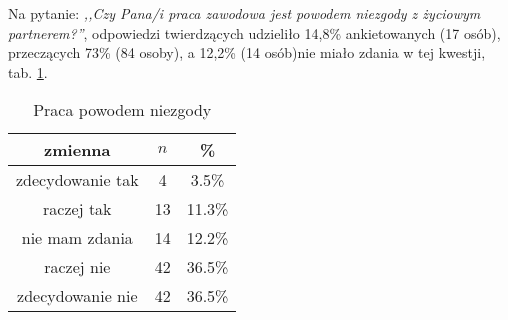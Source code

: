 
Na pytanie: \textit{,,Czy  Pana/i praca zawodowa jest powodem niezgody z życiowym partnerem?''}, odpowiedzi twierdzących udzieliło 14,8\% ankietowanych (17 osób), przeczących 73\% (84 osoby), a 12,2\% (14 osób)nie miało zdania w tej kwestji, tab. \ref{tab:Q28}.

\begin{table}[H]
\caption{Praca powodem niezgody}
\centering
\begin{tabular}{ | c | c | c |}
\hline
zmienna & $n$ & \% \\
\hline
zdecydowanie tak  &  4  & 3.5\% \\
\hline
raczej tak  &  13  & 11.3\% \\
\hline
nie mam zdania  &  14  & 12.2\% \\
\hline
raczej nie  &  42  & 36.5\% \\
\hline
zdecydowanie nie  &  42  & 36.5\% \\
\hline
\end{tabular}
\label{tab:Q28}
\end{table}
